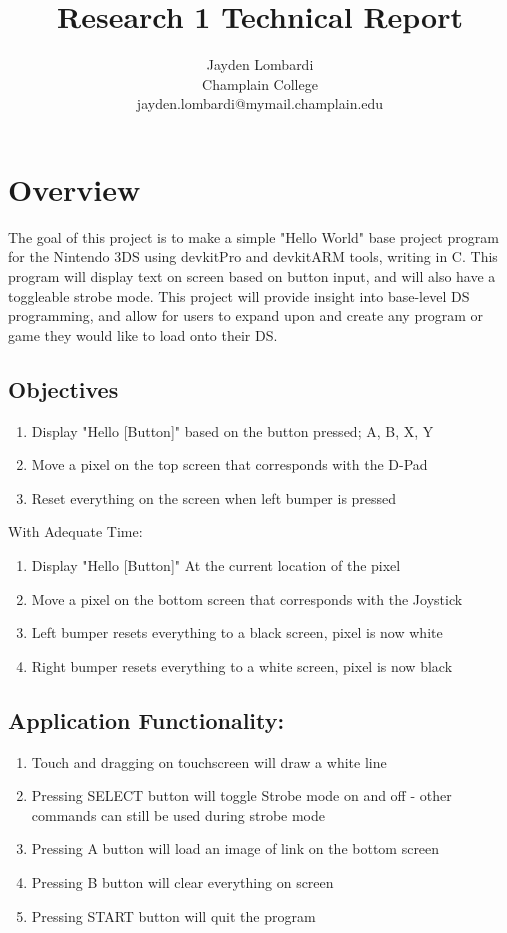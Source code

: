 \documentclass{article}
\title{Research 1 Technical Report}
\author{Jayden Lombardi \\
Champlain College \\
jayden.lombardi@mymail.champlain.edu}
\begin{document}
\maketitle

\section{Overview}
The goal of this project is to make a simple "Hello World" base project program for the Nintendo 3DS using devkitPro and devkitARM tools, writing in C. This program will display text on screen based on button input, and will also have a toggleable strobe mode. This project will provide insight into base-level DS programming, and allow for users to expand upon and create any program or game they would like to load onto their DS. 

\subsection{Objectives}
\begin{enumerate}
\item Display "Hello [Button]" based on the button pressed; A, B, X, Y
\item Move a pixel on the top screen that corresponds with the D-Pad
\item Reset everything on the screen when left bumper is pressed
\end{enumerate}

With Adequate Time:
\begin{enumerate}
\item Display "Hello [Button]" At the current location of the pixel
\item Move a pixel on the bottom screen that corresponds with the Joystick
\item Left bumper resets everything to a black screen, pixel is now white
\item Right bumper resets everything to a white screen, pixel is now black
\end{enumerate}

\subsection{Application Functionality:}
\begin{enumerate}
    \item Touch and dragging on touchscreen will draw a white line
    \item Pressing SELECT button will toggle Strobe mode on and off - other commands can still be used during strobe mode
    \item Pressing A button will load an image of link on the bottom screen
    \item Pressing B button will clear everything on screen
    \item Pressing START button will quit the program
\end{enumerate}
\end{document}
